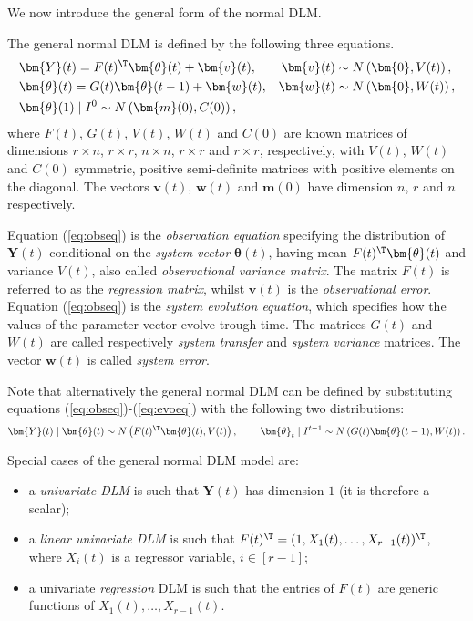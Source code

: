 We now introduce the general form of the normal \gls{DLM}. 

\begin{definition}
\label{def:DLM}
The general normal \gls{DLM} is defined by the following three equations.
\begin{align}
&\bm{Y}(t)=F(t)^{\T}\bm{\theta}(t)+\bm{v}(t),  &\bm{v}(t)&\sim N\left(\bm{0},V(t)\right),\label{eq:obseq}\\
&\bm{\theta}(t)=G(t)\bm{\theta}(t-1)+\bm{w}(t),  &\bm{w}(t)&\sim N\left(\bm{0},W(t)\right),\label{eq:evoeq}
\\
&\bm{\theta}(1)\;|\;I^0\sim N\left(\bm{m}(0),C(0)\right),\nonumber \label{eq:ininfo}
\end{align}
where $F(t)$, $G(t)$, $V(t)$, $W(t)$ and $C(0)$ are known matrices of dimensions $r\times n$, $r\times r$, $n\times n$, $r\times r$ and $r\times r$, respectively, with $V(t)$, $W(t)$ and $C(0)$ symmetric, positive semi-definite matrices with positive elements on the diagonal. The vectors $\bm{v}(t)$, $\bm{w}(t)$ and $\bm{m}(0)$ have dimension $n$, $r$ and $n$ respectively.  
\end{definition}
Equation (\ref{eq:obseq}) is the \textit{observation equation} specifying the distribution of $\bm{Y}(t)$ conditional on the \textit{system vector} $\bm{\theta}(t)$, having mean $F(t)^{\T}\bm{\theta}(t)$ and variance $V(t)$, also called \textit{observational variance matrix}. The matrix $F(t)$ is referred to as the \textit{regression matrix}, whilst $\bm{v}(t)$ is the \textit{observational error}. Equation (\ref{eq:obseq}) is the \textit{system evolution equation}, which specifies how the values of the parameter vector evolve trough time. The matrices $G(t)$ and $W(t)$ are called respectively \textit{system transfer} and \textit{system variance} matrices. The vector $\bm{w}(t)$ is called \textit{system error}. 

Note that alternatively the general normal \gls{DLM} can be defined by substituting equations (\ref{eq:obseq})-(\ref{eq:evoeq}) with the following two distributions:
\begin{equation*}
\label{eq:dlmdefinition}
\bm{Y}(t)\;|\;\bm{\theta}(t)\sim N\left(F(t)^{\T}\bm{\theta}(t), V(t)\right),\;\;\;\;\;\;\;\; \bm{\theta}_t\;|\; I^{t-1} \sim N\left(G(t)\bm{\theta}(t-1),W(t)\right).
\end{equation*}

\begin{example}
Special cases of the general normal \gls{DLM} model are:
\begin{itemize}
\item a \textit{univariate \gls{DLM}} is such that $\bm{Y}(t)$ has dimension $1$ (it is therefore a scalar);
\item a \textit{linear univariate \gls{DLM}} is such that $F(t)^\T=(1,X_{1}(t),\dots,X_{r-1}(t))^\T$, where $X_{i}(t)$ is a regressor variable, $i\in [r-1]$;
\item a univariate \textit{regression} \gls{DLM} is such that the entries of $F(t)$ are generic functions of $X_{1}(t),\dots,X_{r-1}(t)$. 
\end{itemize}
\end{example}

